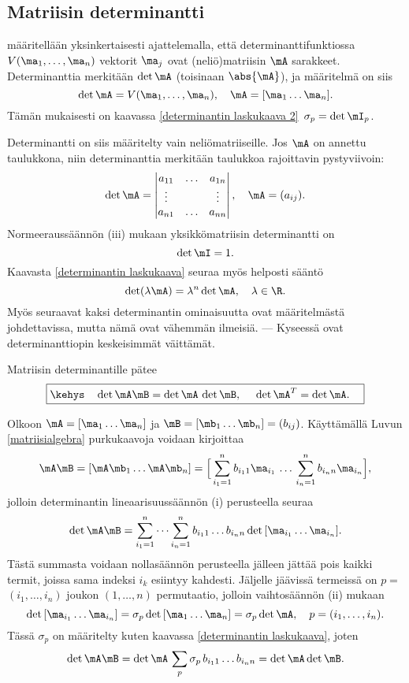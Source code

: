 \subsection*{Matriisin determinantti}

 määritellään yksinkertaisesti ajattelemalla, että 
determinanttifunktiossa $V(\ma_1,\ldots,\ma_n)$ vektorit $\ma_j$ ovat (neliö)matriisin $\mA$ 
sarakkeet. Determinanttia merkitään $\det\mA$ (toisinaan $\abs{\mA}$), ja määritelmä on siis
\[
\det\mA=V(\ma_1,\ldots,\ma_n), \quad \mA=[\ma_1 \ldots \ma_n].
\]
Tämän mukaisesti on kaavassa \eqref{determinantin laskukaava 2} $\,\sigma_p = \det\mI_p$.

Determinantti on siis määritelty vain neliömatriiseille. Jos $\mA$ on annettu taulukkona, niin
determinanttia merkitään taulukkoa rajoittavin pystyviivoin:
\[
\det\mA=\begin{vmatrix}
a_{11} & \ldots & a_{1n} \\
\vdots &  & \vdots \\
a_{n1} & \ldots & a_{nn}
\end{vmatrix}, \quad \mA=(a_{ij}).
\]
Normeeraussäännön (iii) mukaan yksikkömatriisin determinantti on
\[
\det\mI=1.
\]
Kaavasta \eqref{determinantin laskukaava} seuraa myös helposti sääntö
\[
\det(\lambda\mA)=\lambda^n\det\mA, \quad \lambda \in \R.
\]
Myös seuraavat kaksi determinantin ominaisuutta ovat määritelmästä johdettavissa, mutta nämä
ovat vähemmän ilmeisiä. --- Kyseessä ovat determinanttiopin keskeisimmät väittämät.
\begin{Lause} Matriisin determinantille pätee
\[
\boxed{\kehys \quad \det\mA\mB = \det\mA\,\det\mB, \quad\ \det\mA^T = \det\mA. \quad}
\]
\end{Lause}
\tod Olkoon $\mA=[\ma_1 \ldots \ma_n]$ ja $\mB=[\mb_1 \ldots \mb_n]=(b_{ij})$. Käyttämällä Luvun
\ref{matriisialgebra} purkukaavoja voidaan kirjoittaa
\[
\mA\mB 
= [\mA\mb_1 \ldots \mA\mb_n] 
= \Bigl[\,\sum_{i_1=1}^n b_{i_11}\ma_{i_1}\,\ldots\,\sum_{i_n=1}^n b_{i_nn}\ma_{i_n}\Bigr],
\]
jolloin determinantin lineaarisuussäännön (i) perusteella seuraa
\[
\det\mA\mB 
= \sum_{i_1=1}^n\cdots\sum_{i_n=1}^n b_{i_11}\ldots b_{i_nn}\det\,[\ma_{i_1} \ldots \ma_{i_n}].
\]
Tästä summasta voidaan nollasäännön perusteella jälleen jättää pois kaikki termit, joissa sama
indeksi $i_k$ esiintyy kahdesti. Jäljelle jäävissä termeissä on $p=$ $(i_1,\ldots,i_n)$ joukon 
$(1,\ldots,n)$ permutaatio, jolloin vaihtosäännön (ii) mukaan
\[
\det\,[\ma_{i_1} \ldots \ma_{i_n}] = \sigma_p\det\,[\ma_1 \ldots \ma_n] 
                                  = \sigma_p\det\mA, \quad p=(i_1,\ldots,i_n).
\]
Tässä $\sigma_p$ on määritelty kuten kaavassa \eqref{determinantin laskukaava}, joten
\[
\det\mA\mB = \det\mA\,\sum_p \sigma_p\,b_{i_11}\ldots b_{i_nn} = \det\mA\det\mB.
\]

